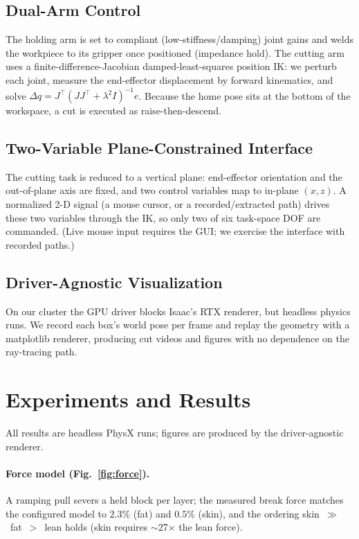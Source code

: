 \documentclass[conference]{IEEEtran}
\begin{document}
\subsection{Dual-Arm Control}
The holding arm is set to compliant (low-stiffness/damping) joint gains and welds the workpiece to its
gripper once positioned (impedance hold). The cutting arm uses a finite-difference-Jacobian
damped-least-squares position IK: we perturb each joint, measure the end-effector displacement by
forward kinematics, and solve $\Delta q = J^\top (JJ^\top + \lambda^2 I)^{-1} e$. Because the home pose
sits at the bottom of the workspace, a cut is executed as raise-then-descend.

\subsection{Two-Variable Plane-Constrained Interface}
The cutting task is reduced to a vertical plane: end-effector orientation and the out-of-plane axis are
fixed, and two control variables map to in-plane $(x,z)$. A normalized 2-D signal (a mouse cursor, or a
recorded/extracted path) drives these two variables through the IK, so only two of six task-space DOF
are commanded. (Live mouse input requires the GUI; we exercise the interface with recorded paths.)

\subsection{Driver-Agnostic Visualization}
On our cluster the GPU driver blocks Isaac's RTX renderer, but headless physics runs. We record each
box's world pose per frame and replay the geometry with a matplotlib renderer, producing cut videos and
figures with no dependence on the ray-tracing path.

\section{Experiments and Results}
\label{sec:exp}
All results are headless PhysX runs; figures are produced by the driver-agnostic renderer.

\paragraph{Force model (Fig.~\ref{fig:force}).} A ramping pull severs a held block per layer; the
measured break force matches the configured model to $2.3\%$ (fat) and $0.5\%$ (skin), and the ordering
skin~$\gg$~fat~$>$~lean holds (skin requires $\sim$27$\times$ the lean force).
\end{document}
